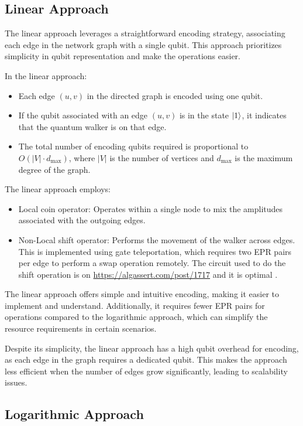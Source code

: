 \documentclass{article}
\begin{document}
	\subsection{Linear Approach}
		
		The linear approach leverages a straightforward encoding strategy, associating each edge in the network graph with a single qubit. This approach prioritizes simplicity in qubit representation and make the operations easier.
		
		In the linear approach:
		\begin{itemize}
			\item Each edge \( (u, v) \) in the directed graph is encoded using one qubit.
			\item If the qubit associated with an edge \( (u, v) \) is in the state \( \ket{1} \), it indicates that the quantum walker is on that edge.
			\item The total number of encoding qubits required is proportional to \( O(|V| \cdot d_{\text{max}}) \), where \( |V| \) is the number of vertices and \( d_{\text{max}} \) is the maximum degree of the graph.
		\end{itemize}
		
		The linear approach employs:
		\begin{itemize}
			\item Local coin operator: Operates within a single node to mix the amplitudes associated with the outgoing edges.
			\item Non-Local shift operator: Performs the movement of the walker across edges. This is implemented using gate teleportation, which requires two EPR pairs per edge to perform a swap operation remotely. The circuit used to do the shift operation is on \hyperlink{https://algassert.com/post/1717}{https://algassert.com/post/1717} and it is optimal \cite{swap}.
		\end{itemize}
		
		The linear approach offers simple and intuitive encoding, making it easier to implement and understand. Additionally, it requires fewer EPR pairs for operations compared to the logarithmic approach, which can simplify the resource requirements in certain scenarios.

		Despite its simplicity, the linear approach has a high qubit overhead for encoding, as each edge in the graph requires a dedicated qubit. This makes the approach less efficient when the number of edges grow significantly, leading to scalability issues.
		
	\subsection{Logarithmic Approach}
		
\end{document}

